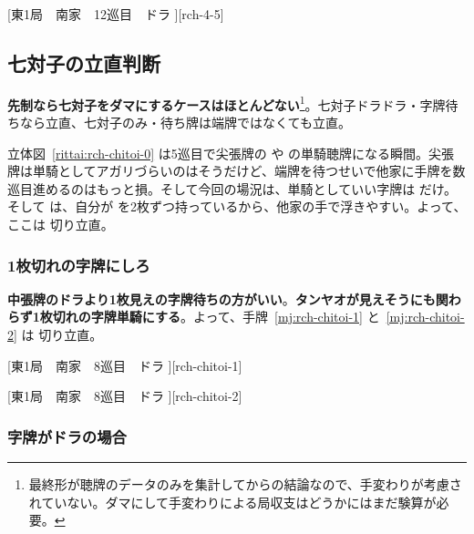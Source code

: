\documentclass[../nankiru_main.tex]{subfiles}
\begin{document}
[東1局　南家　12巡目　ドラ ][rch-4-5] 


\subsection{七対子の立直判断}

\textbf{先制なら七対子をダマにするケースはほとんどない}\footnote{最終形が聴牌のデータのみを集計してからの結論なので、手変わりが考慮されていない\citep[][p.~102]{miinin-choice}。ダマにして手変わりによる局収支はどうかにはまだ験算が必要。}。七対子ドラドラ・字牌待ちなら立直、七対子のみ・待ち牌は端牌ではなくても立直\citep[][pp. 101--102]{miinin-choice}。

立体図~\ref{rittai:rch-chitoi-0} は5巡目で尖張牌の  や  の単騎聴牌になる瞬間。尖張牌は単騎としてアガリづらいのはそうだけど、端牌を待つせいで他家に手牌を数巡目進めるのはもっと損。そして今回の場況は、単騎としていい字牌は  だけ。そして  は、自分が  を2枚ずつ持っているから、他家の手で浮きやすい。よって、ここは  切り立直\citep[][pp.~193--194]{fkt}。

\begin{rittai}[h]
  \centering
  \caption{}
  \label{rittai:rch-chitoi-0}
\end{rittai}


\subsubsection*{1枚切れの字牌にしろ}

\textbf{中張牌のドラより1枚見えの字牌待ちの方がいい}\citep[][pp. 109--110]{miinin-choice}。\textbf{タンヤオが見えそうにも関わらず1枚切れの字牌単騎にする}\citep[][pp. 111-112]{miinin-choice}。よって、手牌~\ref{mj:rch-chitoi-1} と~\ref{mj:rch-chitoi-2} は  切り立直。

[東1局　南家　8巡目　ドラ ][rch-chitoi-1]

[東1局　南家　8巡目　ドラ ][rch-chitoi-2]


\subsubsection*{字牌がドラの場合}
\end{document}
